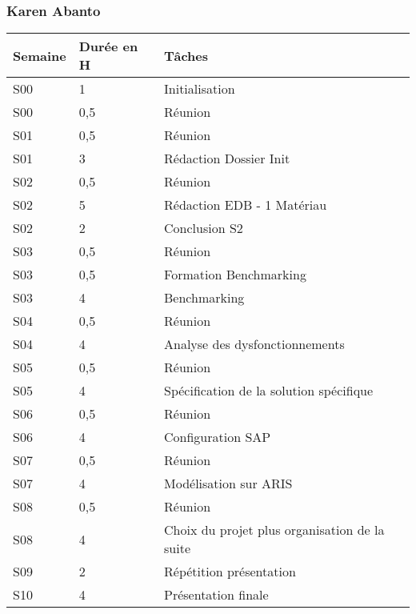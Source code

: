\subsubsection{Karen Abanto}
\begin{tabular}{|l|l|l|}
\hline
Semaine&Durée en H&Tâches\\
\hline
S00&1&Initialisation\\
\hline
S00&0,5&Réunion\\
\hline
S01&0,5&Réunion\\
\hline
S01&3&Rédaction Dossier Init\\
\hline
S02&0,5&Réunion\\
\hline
S02&5&Rédaction EDB - 1 Matériau\\
\hline
S02&2&Conclusion S2\\
\hline
S03&0,5&Réunion\\
\hline
S03&0,5&Formation Benchmarking\\
\hline
S03&4&Benchmarking\\
\hline
S04&0,5&Réunion\\
\hline
S04&4&Analyse des dysfonctionnements\\
\hline
S05&0,5&Réunion\\
\hline
S05&4&Spécification de la solution spécifique\\
\hline
S06&0,5&Réunion\\
\hline
S06&4&Configuration SAP\\
\hline
S07&0,5&Réunion\\
\hline
S07&4&Modélisation sur ARIS\\
\hline
S08&0,5&Réunion\\
\hline
S08&4&Choix du projet plus organisation de la suite\\
\hline
S09&2&Répétition présentation\\
\hline
S10&4&Présentation finale\\
\hline
\end{tabular}


